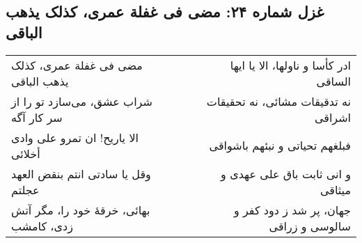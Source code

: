 \begin{center}
\section*{غزل شماره ۲۴: مضی فی غفلة عمری، کذلک یذهب الباقی}
\label{sec:024}
\begin{longtable}{l p{0.5cm} r}
مضی فی غفلة عمری، کذلک یذهب الباقی
&&
ادر کأسا و ناولها، الا یا ایها الساقی
\\
شراب عشق، می‌سازد تو را از سر کار آگه
&&
نه تدقیقات مشائی، نه تحقیقات اشراقی
\\
الا یاریح! ان تمرو علی وادی أخلائی
&&
فبلغهم تحیاتی و نبئهم باشواقی
\\
وقل یا سادتی انتم بنقض العهد عجلتم
&&
و انی ثابت باق علی عهدی و میثاقی
\\
بهائی، خرقهٔ خود را، مگر آتش زدی، کامشب
&&
جهان، پر شد ز دود کفر و سالوسی و زراقی
\\
\end{longtable}
\end{center}
